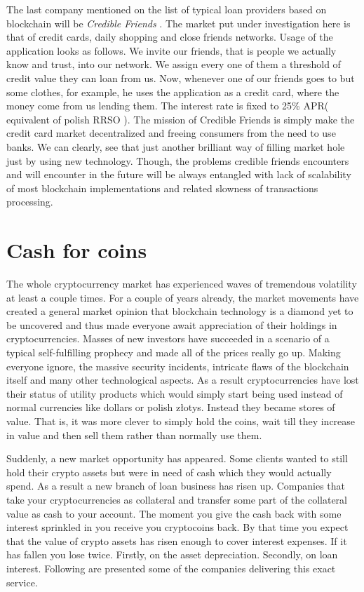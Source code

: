 \documentclass[a4paper,12pt,twoside,openany]{report}
\begin{document}
The last company mentioned on the list of typical loan providers based on blockchain will be \textit{Credible Friends} \cite{credible}. The market put under investigation here is that of credit cards, daily shopping and close friends networks. Usage of the application looks as follows. We invite our friends, that is people we actually know and trust, into our network. We assign every one of them a threshold of credit value they can loan from us. Now, whenever one of our friends goes to but some clothes, for example, he uses the application as a credit card, where the money come from us lending them.   The interest rate is fixed to 25\% APR( equivalent of polish RRSO ). The mission of Credible Friends is simply make the credit card market decentralized and freeing consumers from the need to use banks. We can clearly, see that just another brilliant way of filling market hole just by using new technology. Though, the problems credible friends encounters and will encounter in the future will be always entangled with lack of scalability of most blockchain implementations and related slowness of transactions processing.

\section{Cash for coins}

The whole cryptocurrency market has experienced waves of tremendous volatility at least a couple times. For a couple of years already, the market movements have created a general market opinion that blockchain technology is a diamond yet to be uncovered and thus made everyone await appreciation of their holdings in cryptocurrencies. Masses of new investors have succeeded in a scenario of a typical self-fulfilling prophecy and made all of the prices really go up. Making everyone ignore, the massive security incidents, intricate flaws of the blockchain itself and many other technological aspects. As a result cryptocurrencies have lost their status of utility products which would simply start being used instead of normal currencies like dollars or polish złotys. Instead they became stores of value. That is, it was more  clever to simply hold the coins, wait till they increase in value and then sell them rather than normally use them. 

Suddenly, a new market opportunity has appeared. Some clients wanted to still hold their crypto assets but were in need of cash which they would actually spend. As a result a new branch of loan business has risen up. Companies that take your cryptocurrencies as collateral and transfer some part of the collateral value as cash to your account. The moment you give the cash back with some interest sprinkled in you receive you cryptocoins back. By that time you expect that the value of crypto assets has risen enough to cover interest expenses. If it has fallen you lose twice. Firstly, on the asset depreciation. Secondly, on loan interest. Following are presented some of the companies delivering this exact service.
\end{document}
